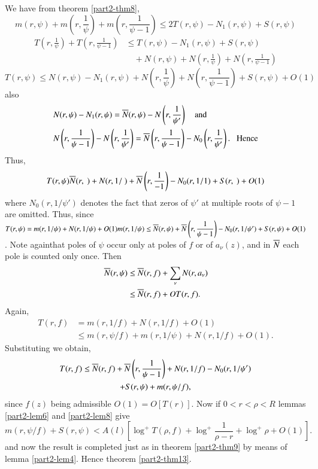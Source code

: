 \setcounter{proofofthm}{12}
\begin{proofofthm}\label{part2-proofofthm13}
We have from theorem \ref{part2-thm8},
$$
m(r,\psi)+m\left(r,\frac{1}{\psi}\right)+m\left(r,\frac{1}{\psi-1}\right)\leq
2T(r,\psi)-N_{1}(r,\psi)+S(r,\psi)
$$
\ie
\begin{align*}
T\left(r,\frac{1}{\psi}\right)+T\left(r,\frac{1}{\psi-1}\right) &\leq
T(r,\psi)-N_{1}(r,\psi)+S(r,\psi)\\
&\quad
+N(r,\psi)+N\left(r,\frac{1}{\psi}\right)+N\left(r,\frac{1}{\psi-1}\right) 
\end{align*}
\ie
$$
T(r,\psi)\leq
N(r,\psi)-N_{1}(r,\psi)+N\left(r,\frac{1}{\psi}\right)+N\left(r,\frac{1}{\psi-1}\right)+S(r,\psi)+O(1) 
$$
also
\begin{align*}
&
  N(r,\psi)-N_{1}(r,\psi)=\overline{N}(r,\psi)-N\left(r,\frac{1}{\psi'}\right)\quad\text{and}\\
&
  N\left(r,\frac{1}{\psi-1}\right)-N\left(r,\frac{1}{\psi'}\right)=\overline{N}\left(r,\frac{1}{\psi-1}\right)-N_{0}\left(r,\frac{1}{\psi'}\right). \text{
    \;\ Hence}
\end{align*}
Thus,
$$
T(r,\psi)\ob{N}(r, \ )+N(r,1/
\ )+\ob{N}\left(r,\frac{1}{-1}\right)-N_{0}(r,1/1)+S(r, \ )+O(1)
$$
where $N_{0}(r,1/\psi')$ denotes the fact that zeros of $\psi'$ at
multiple roots of $\psi-1$ are omitted. Thus, since
$T(r,\psi)=m(r,1/\psi)+N(r,1/\psi)+O(1)m(r,1/\psi)\leq
\overline{N}(r,\psi)+\overline{N}\left(r,\dfrac{1}{\psi-1}\right)-N_{0}(r,1/\psi')+S(r,\psi)+O(1)$. Note
again\pageoriginale that poles of $\psi$ occur only at poles of $f$ or
of $a_{\nu}(z)$, and in $\overline{N}$ each pole is counted only once. Then
\begin{align*}
\overline{N}(r,\psi) &\leq \overline{N}(r,f)+\sum_{\nu}N(r,a_{\nu})\\
&\leq \overline{N}(r,f)+OT(r,f).
\end{align*}
Again,
\begin{align*}
T(r,f) &= m(r,1/f)+N(r,1/f)+O(1)\\
&\leq m(r,\psi/f)+m(r,1/\psi)+N(r,1/f)+O(1).
\end{align*}
Substituting we obtain,
\begin{gather*}
[O(1)+1] T(r,f)\leq \ob{N}(r,f) +
\ob{N}\left(r,\frac{1}{\psi-1}\right)+N(r,1/f)-N_{0}(r,1/\psi')\\
+S(r,\psi)+ m(r,\psi/f),
\end{gather*}
since $f(z)$ being admissible $O(1)=O[T(r)]$. Now if $0<r<\rho<R$
lemmas \ref{part2-lem6} and \ref{part2-lem8} give
$$
m(r,\psi/f)+S(r,\psi)<A(l)\left[\log^{+}T(\rho,f)+\log^{+}\frac{1}{\rho-r}+\log^{+}\rho+O(1)\right]. 
$$
and now the result is completed just as in theorem \ref{part2-thm9} by
means of lemma \ref{part2-lem4}. Hence theorem \ref{part2-thm13}.
\end{proofofthm}

